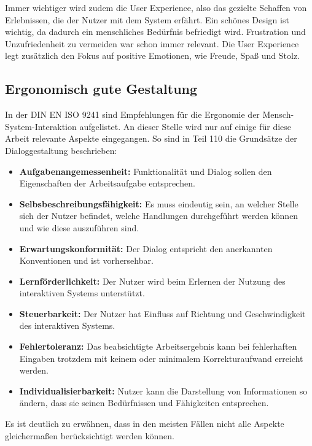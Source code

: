 Immer wichtiger wird zudem die User Experience, also das gezielte Schaffen von Erlebnissen, die der Nutzer mit dem System erfährt. Ein schönes Design ist wichtig, da dadurch ein menschliches Bedürfnis befriedigt wird. Frustration und Unzufriedenheit zu vermeiden war schon immer relevant. Die User Experience legt zusätzlich den Fokus auf positive Emotionen, wie Freude, Spaß und Stolz.

\subsection{Ergonomisch gute Gestaltung}
In der DIN EN ISO 9241 sind Empfehlungen für die Ergonomie der Mensch-System-Interaktion aufgelistet. An dieser Stelle wird nur auf einige für diese Arbeit relevante Aspekte eingegangen. So sind in Teil 110 die Grundsätze der Dialoggestaltung beschrieben:
\begin{itemize}
\item \textbf{Aufgabenangemessenheit:} Funktionalität und Dialog sollen den Eigenschaften der Arbeitsaufgabe entsprechen.
\item \textbf{Selbsbeschreibungsfähigkeit:}  Es muss eindeutig sein, an welcher Stelle sich der Nutzer befindet, welche Handlungen durchgeführt werden können und wie diese auszuführen sind.
\item \textbf{Erwartungskonformität:} Der Dialog entspricht den anerkannten Konventionen und ist vorhersehbar.
\item \textbf{Lernförderlichkeit:} Der Nutzer wird beim Erlernen der Nutzung des interaktiven Systems unterstützt.
\item \textbf{Steuerbarkeit:} Der Nutzer hat Einfluss auf Richtung und Geschwindigkeit des interaktiven Systems.
\item \textbf{Fehlertoleranz:} Das beabsichtigte Arbeitsergebnis kann bei fehlerhaften Eingaben trotzdem mit keinem oder minimalem Korrekturaufwand erreicht werden.
\item \textbf{Individualisierbarkeit:} Nutzer kann die Darstellung von Informationen so ändern, dass sie seinen Bedürfnissen und Fähigkeiten entsprechen.
\end{itemize}
Es ist deutlich zu erwähnen, dass in den meisten Fällen nicht alle Aspekte gleichermaßen berücksichtigt werden können.

